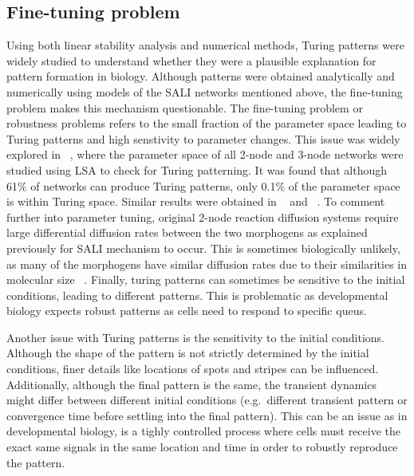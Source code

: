 \subsection{Fine-tuning problem}

Using both linear stability analysis and numerical methods, Turing patterns were widely studied to understand whether they were a plausible explanation for pattern formation in biology.
Although patterns were obtained analytically and numerically using models of the SALI networks mentioned above, the fine-tuning problem makes this mechanism questionable.
The fine-tuning problem or robustness problems refers to the small fraction of the parameter space leading to Turing patterns and high senstivity to parameter changes.
This issue was widely explored in ~\cite{Scholes2019}, where the parameter space of all 2-node and 3-node networks were studied using LSA to check for Turing patterning.
It was found that although 61\% of networks can produce Turing patterns, only 0.1\% of the parameter space is within Turing space.
Similar results were obtained in ~\cite{Zheng2016} and ~\cite{Marcon}.
To comment further into parameter tuning, original 2-node reaction diffusion systems require large differential diffusion rates between the two morphogens as explained previously for SALI mechanism to occur.
This is sometimes biologically unlikely, as many of the morphogens have similar diffusion rates due to their similarities in molecular size ~\parencite{huidobro}.
Finally, turing patterns can sometimes be sensitive to the initial conditions, leading to different patterns.
This is problematic as developmental biology expects robust patterns as cells need to respond to specific queus.   %

Another issue with Turing patterns is the sensitivity to the initial conditions.
Although the shape of the pattern is not strictly determined by the initial conditions, finer details like locations of spots and stripes can be influenced.
Additionally, although the final pattern is the same, the transient dynamics might differ between different initial conditions (e.g.\ different transient pattern or convergence time before settling into the final pattern). This can be an issue as in developmental biology, is a tighly controlled process where cells must receive the exact same signals in the same location and time in order to robustly reproduce the pattern. %





